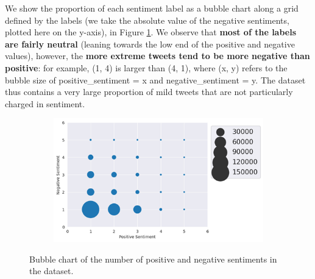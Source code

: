 We show the proportion of each sentiment label as a bubble chart along a grid defined by the labels (we take the absolute value of the negative sentiments, plotted here on the y-axis), in Figure \ref{fig:bubble}. We observe that \textbf{most of the labels are fairly neutral} (leaning towards the low end of the positive and negative values), however, the \textbf{more extreme tweets tend to be more negative than positive}: for example, (1, 4) is larger than (4, 1), where (x, y) refers to the bubble size of positive\_sentiment = x and negative\_sentiment = y. The dataset thus contains a very large proportion of mild tweets that are not particularly charged in sentiment.

\begin{figure}
    \centering
    \begin{subfigure}{0.7\columnwidth}
        \includegraphics[width=1\textwidth]{images/bubble.png}
    \end{subfigure}
    \caption{Bubble chart of the number of positive and negative sentiments in the dataset.}
    \label{fig:bubble}
\end{figure}

